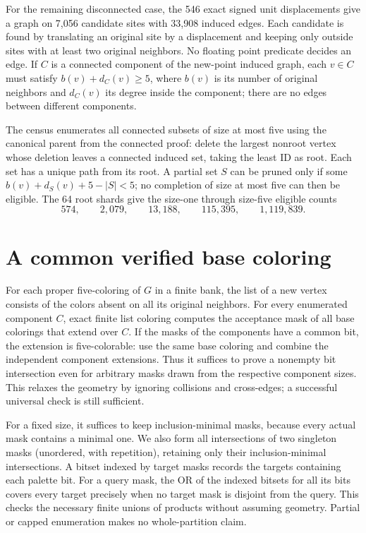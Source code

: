 \documentclass[11pt,letterpaper]{article}
\begin{document}
For the remaining disconnected case, the 546 exact signed
unit displacements give a graph on 7,056 candidate sites with
33,908 induced edges. Each candidate is found by translating
an original site by a displacement and keeping only outside sites
with at least two original neighbors. No floating point
predicate decides an edge. If \(C\) is a connected component
of the new-point induced graph, each \(v\in C\) must satisfy
\(b(v)+d_C(v)\ge5\), where \(b(v)\) is its number of original
neighbors and \(d_C(v)\) its degree inside the component; there
are no edges between different components.

The census enumerates all connected subsets of size at most
five using the canonical parent from the connected proof:
delete the largest nonroot vertex whose deletion leaves a
connected induced set, taking the least ID as root. Each set
has a unique path from its root. A partial set \(S\) can be
pruned only if some \(b(v)+d_S(v)+5-|S|<5\); no completion of
size at most five can then be eligible. The 64 root shards
give the size-one through size-five eligible counts
\[
 574,\qquad 2{,}079,\qquad 13{,}188,\qquad
 115{,}395,\qquad 1{,}119{,}839.
\]

\section{A common verified base coloring}
For each proper five-coloring of \(G\) in a finite bank,
the list of a new vertex consists of the colors absent on all
its original neighbors. For every enumerated component
\(C\), exact finite list coloring computes the acceptance mask
of all base colorings that extend over \(C\).
If the masks of the components have a common bit, the
extension is five-colorable: use the same base coloring and
combine the independent component extensions. Thus it suffices
to prove a nonempty bit intersection even for arbitrary masks
drawn from the respective component sizes. This relaxes the
geometry by ignoring collisions and cross-edges; a successful
universal check is still sufficient.

For a fixed size, it suffices to keep inclusion-minimal masks,
because every actual mask contains a minimal one.
We also form all intersections of two singleton masks
(unordered, with repetition), retaining only their inclusion-minimal
intersections. A bitset indexed by target masks records
the targets containing each palette bit. For a query mask,
the OR of the indexed bitsets for all its bits covers every
target precisely when no target mask is disjoint from the query.
This checks the necessary finite unions of products without
assuming geometry. Partial or capped enumeration makes no
whole-partition claim.
\end{document}
